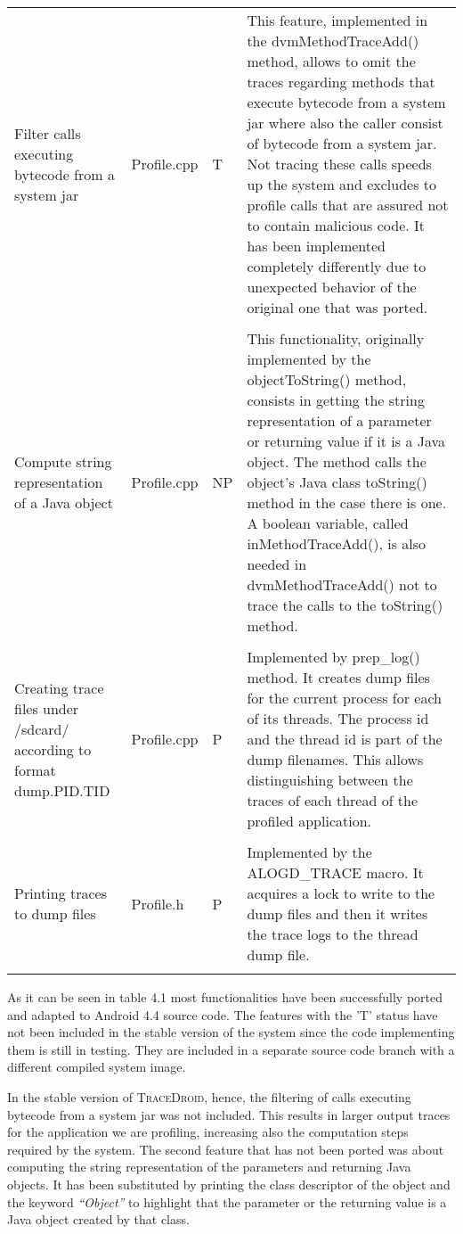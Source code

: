 \begin{longtabu}{XllX}
  & & & \\
  \hline
  Filter calls executing bytecode from a system jar & Profile.cpp & T & This feature, implemented in the dvmMethodTraceAdd() method, allows to omit the traces regarding methods that execute bytecode from a system jar where also the caller consist of bytecode from a system jar. Not tracing these calls speeds up the system and excludes to profile calls that are assured not to contain malicious code. It has been implemented completely differently due to unexpected behavior of the original one that was ported. \\
  & & & \\
  \hline
  Compute string representation of a Java object & Profile.cpp & NP & This functionality, originally implemented by the objectToString() method, consists in getting the string representation of a parameter or returning value if it is a Java object. The method calls the object's Java class toString() method in the case there is one. A boolean variable, called inMethodTraceAdd(), is also needed in dvmMethodTraceAdd() not to trace the calls to the toString() method. \\
  & & & \\
  \hline
  Creating trace files under /sdcard/ according to format dump.PID.TID & Profile.cpp & P & Implemented by prep\_log() method. It creates dump files for the current process for each of its threads. The process id and the thread id is part of the dump filenames. This allows distinguishing between the traces of each thread of the profiled application. \\
  & & & \\
  \hline
  Printing traces to dump files & Profile.h & P & Implemented by the ALOGD\_TRACE macro. It acquires a lock to write to the dump files and then it writes the trace logs to the thread dump file.\\
  & & & \\
\end{longtabu}

As it can be seen in table 4.1 most functionalities have been
successfully ported and adapted to Android 4.4 source code. The
features with the 'T' status have not been included in the stable
version of the system since the code implementing them is still in
testing. They are included in a separate source code branch with a
different compiled system image.

In the stable version of \textsc{TraceDroid}, hence, the filtering of calls
executing bytecode from a system jar was not included. This results in
larger output traces for the application we are profiling, increasing
also the computation steps required by the system. The second feature
that has not been ported was about computing the string representation
of the parameters and returning Java objects. It has been substituted
by printing the class descriptor of the object and the keyword
\textit{“Object”} to highlight that the parameter or the returning value is a
Java object created by that class.
